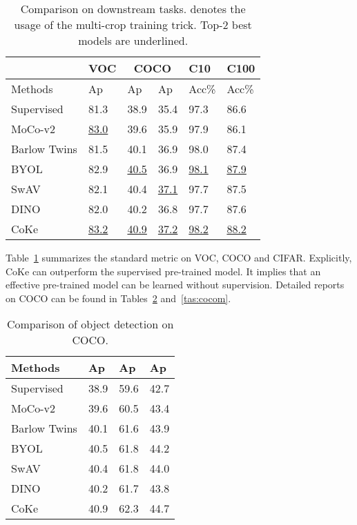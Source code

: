 \documentclass[10pt,twocolumn,letterpaper]{article}
\begin{document}
\begin{table}[!ht]
\centering
\small
\begin{tabular}{|l|l|l|l|l|l|}\hline
&VOC&\multicolumn{2}{c|}{COCO}&C10&C100\\\hline
Methods&Ap&Ap&Ap&Acc\%&Acc\%\\\hline
Supervised&81.3&38.9&35.4 &97.3&86.6\\\hline
MoCo-v2&\underline{83.0}&39.6&35.9&97.9&86.1\\\hline
Barlow Twins&81.5&40.1&36.9&98.0&87.4 \\\hline
BYOL& 82.9&\underline{40.5}&36.9&\underline{98.1}&\underline{87.9}  \\\hline
SwAV&82.1&40.4&\underline{37.1}&97.7&87.5 \\\hline
DINO&82.0&40.2&36.8&97.7& 87.6\\\hline
CoKe&\underline{83.2}&\underline{40.9}&\underline{37.2}&\underline{98.2}&\underline{88.2}\\\hline
\end{tabular}
\caption{Comparison on downstream tasks.  denotes the usage of the multi-crop training trick. Top-2 best models are underlined.}\label{tas:ds}
\end{table}


Table~\ref{tas:ds} summarizes the standard metric on VOC, COCO and CIFAR. Explicitly, CoKe can outperform the supervised pre-trained model. It implies that an effective pre-trained model can be learned without supervision. Detailed reports on COCO can be found in Tables~\ref{tas:cocob} and~\ref{tas:cocom}.

\begin{table}[!ht]
\centering
\begin{tabular}{|l|l|l|l|}\hline
Methods&Ap&Ap&Ap\\\hline
Supervised&38.9&59.6&42.7 \\\hline
MoCo-v2&39.6&60.5&43.4 \\\hline
Barlow Twins&40.1&61.6&43.9 \\\hline
BYOL&40.5&61.8&44.2   \\\hline
SwAV&40.4&61.8&44.0 \\\hline
DINO&40.2&61.7&43.8\\\hline
CoKe&40.9&62.3&44.7\\\hline
\end{tabular}
\caption{Comparison of object detection on COCO. }\label{tas:cocob}
\end{table}
\end{document}
